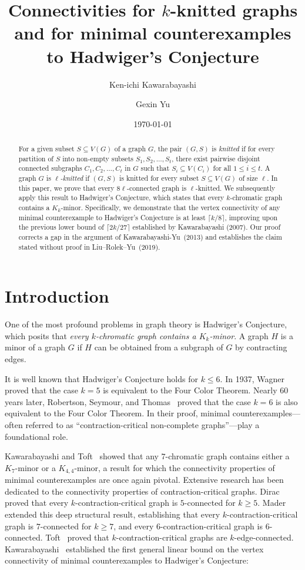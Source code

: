 \documentclass[11pt]{amsart}
\title{Connectivities for $k$-knitted graphs and for minimal counterexamples to Hadwiger's Conjecture}
\author{Ken-ichi Kawarabayashi}
\author{Gexin Yu}
\date{\today}
\begin{document}
\maketitle

\begin{abstract}
For a given subset $S\subseteq V(G)$ of a graph $G$, the pair $(G,S)$ is \emph{knitted} if for every partition of $S$ into non-empty subsets $S_1, S_2, \ldots, S_t$, there exist pairwise disjoint connected subgraphs $C_1, C_2, \ldots, C_t$ in $G$ such that $S_i\subseteq V(C_i)$ for all $1 \le i \le t$. A graph $G$ is \emph{$\ell$-knitted} if $(G,S)$ is knitted for every subset $S\subseteq V(G)$ of size $\ell$. In this paper, we prove that every $8\ell$-connected graph is $\ell$-knitted. We subsequently apply this result to Hadwiger's Conjecture, which states that every $k$-chromatic graph contains a $K_k$-minor. Specifically, we demonstrate that the vertex connectivity of any minimal counterexample to Hadwiger's Conjecture is at least $\lceil k/8 \rceil$, improving upon the previous lower bound of $\lceil 2k/27 \rceil$ established by Kawarabayashi (2007).  Our proof corrects a gap in the argument of Kawarabayashi-Yu~(2013) and establishes the claim stated without proof in Liu--Rolek--Yu~(2019).
\end{abstract}

\section{Introduction}

One of the most profound problems in graph theory is Hadwiger's Conjecture, which posits that \emph{every $k$-chromatic graph contains a $K_k$-minor}. A graph $H$ is a minor of a graph $G$ if $H$ can be obtained from a subgraph of $G$ by contracting edges.

It is well known that Hadwiger's Conjecture holds for $k\le 6$. In 1937, Wagner~\cite{W37} proved that the case $k=5$ is equivalent to the Four Color Theorem. Nearly 60 years later, Robertson, Seymour, and Thomas~\cite{RST93} proved that the case $k=6$ is also equivalent to the Four Color Theorem. In their proof, minimal counterexamples---often referred to as ``contraction-critical non-complete graphs''---play a foundational role. 

Kawarabayashi and Toft~\cite{KT05} showed that any $7$-chromatic graph contains either a $K_7$-minor or a $K_{4,4}$-minor, a result for which the connectivity properties of minimal counterexamples are once again pivotal. Extensive research has been dedicated to the connectivity properties of contraction-critical graphs. Dirac~\cite{D52a} proved that every $k$-contraction-critical graph is $5$-connected for $k\ge 5$. Mader~\cite{M68} extended this deep structural result, establishing that every $k$-contraction-critical graph is $7$-connected for $k\ge 7$, and every $6$-contraction-critical graph is $6$-connected. Toft~\cite{T72} proved that $k$-contraction-critical graphs are $k$-edge-connected. Kawarabayashi~\cite{K07} established the first general linear bound on the vertex connectivity of minimal counterexamples to Hadwiger's Conjecture:
\end{document}
